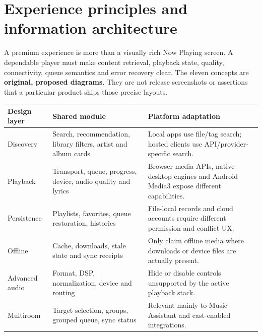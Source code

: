 \documentclass[10pt,a4paper,oneside]{report}
\begin{document}
\section*{Experience principles and information architecture}
A premium experience is more than a visually rich Now Playing screen. A dependable player must make content retrieval, playback state, quality, connectivity, queue semantics and error recovery clear. The eleven concepts are \textbf{original, proposed diagrams}. They are not release screenshots or assertions that a particular product ships those precise layouts.
\begin{longtable}{@{}p{30mm}p{55mm}p{65mm}@{}}\toprule
Design layer & Shared module & Platform adaptation\\\midrule\endhead
Discovery & Search, recommendation, library filters, artist and album cards & Local apps use file/tag search; hosted clients use API/provider-specific search.\\
Playback & Transport, queue, progress, device, audio quality and lyrics & Browser media APIs, native desktop engines and Android Media3 expose different capabilities.\\
Persistence & Playlists, favorites, queue restoration, histories & File-local records and cloud accounts require different permission and conflict UX.\\
Offline & Cache, downloads, stale state and sync receipts & Only claim offline media where downloads or device files are actually present.\\
Advanced audio & Format, DSP, normalization, device and routing & Hide or disable controls unsupported by the active playback stack.\\
Multiroom & Target selection, groups, grouped queue, sync status & Relevant mainly to Music Assistant and cast-enabled integrations.\\
\bottomrule\end{longtable}
\end{document}
